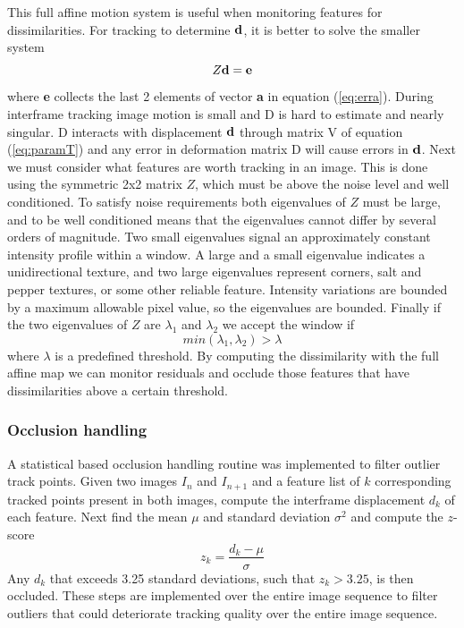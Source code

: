 \documentclass{article}
\begin{document}
This full affine motion system is useful when  monitoring features for dissimilarities.  For tracking to determine ${\bf d}$, it is better to solve the smaller system
\begin{equation}
  Z{\bf d} = {\bf e}
\end{equation}
where {\bf e} collects the last 2 elements of vector {\bf a} in equation (\ref{eq:erra}).  During interframe tracking image motion is small and D is hard to estimate and nearly singular. D interacts with displacement ${\bf d}$ through matrix V of equation (\ref{eq:paramT}) and any error in deformation matrix D will cause errors in ${\bf d}$.  Next we must consider what features are worth tracking in an image.  This is done using the symmetric 2x2 matrix $Z$, which  must be above the noise level and well conditioned. To satisfy noise requirements both eigenvalues of $Z$ must be large, and to be well conditioned means that the eigenvalues cannot differ by several orders of magnitude. Two small eigenvalues signal an approximately constant intensity profile within a window. A large and a small eigenvalue indicates a unidirectional texture, and two large eigenvalues represent corners, salt and pepper textures, or some other reliable feature.  Intensity variations are bounded by a maximum allowable pixel value, so the eigenvalues are bounded.  Finally if the two eigenvalues of $Z$ are $\lambda_1$ and $\lambda_2$ we accept the window if
\begin{equation}
  min(\lambda_1,\lambda_2) > \lambda
\end{equation}
where $\lambda$ is a predefined threshold.  By computing the dissimilarity with the full affine map we can monitor residuals and occlude those features that have dissimilarities above a certain threshold.
\subsubsection{Occlusion handling}
A statistical based occlusion handling routine was implemented to filter outlier track points.  Given two images $I_n$ and $I_{n+1}$ and a feature list of $k$ corresponding tracked points present in both images, compute the interframe displacement $d_k$ of each feature. Next find the mean $\mu$ and standard deviation $\sigma^2$ and compute the $z$-score
\[
z_k = \frac{d_k - \mu}{\sigma}
\]
Any $d_k$ that exceeds 3.25 standard deviations, such that $z_k >3.25$, is then occluded.  These steps are implemented over the entire image sequence to filter outliers that could deteriorate tracking quality over the entire image sequence.
\end{document}
